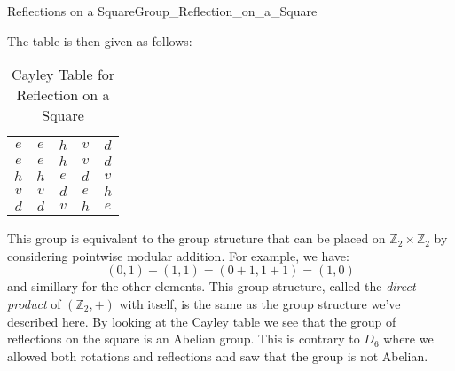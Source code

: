 \begin{lexample}{Reflections on a Square}{Group_Reflection_on_a_Square}
\begin{figure}[H]
            \label{fig:Group_Reflections_on_a_Square}
        \end{figure}
        The table is then given as follows:
        \begin{table}[H]
            \centering
            \captionsetup{type=table}
            \begin{tabular}{c|cccc}
                $e$&$e$&$h$&$v$&$d$\\
                \hline
                $e$&$e$&$h$&$v$&$d$\\
                $h$&$h$&$e$&$d$&$v$\\
                $v$&$v$&$d$&$e$&$h$\\
                $d$&$d$&$v$&$h$&$e$
            \end{tabular}
            \caption{Cayley Table for Reflection on a Square}
            \label{tab:Cayley_Table_Reflection_on_Square}
        \end{table}
        This group is equivalent to the group structure that can be placed on
        $\mathbb{Z}_{2}\times\mathbb{Z}_{2}$ by considering pointwise modular
        addition. For example, we have:
        \begin{equation}
            (0,1)+(1,1)=(0+1,1+1)=(1,0)
        \end{equation}
        and simillary for the other elements. This group structure, called the
        \textit{direct product} of $(\mathbb{Z}_{2},+)$ with itself, is the same
        as the group structure we've described here. By looking at the Cayley
        table we see that the group of reflections on the square is an Abelian
        group. This is contrary to $D_{6}$ where we allowed both rotations and
        reflections and saw that the group is not Abelian.
    \end{lexample}
